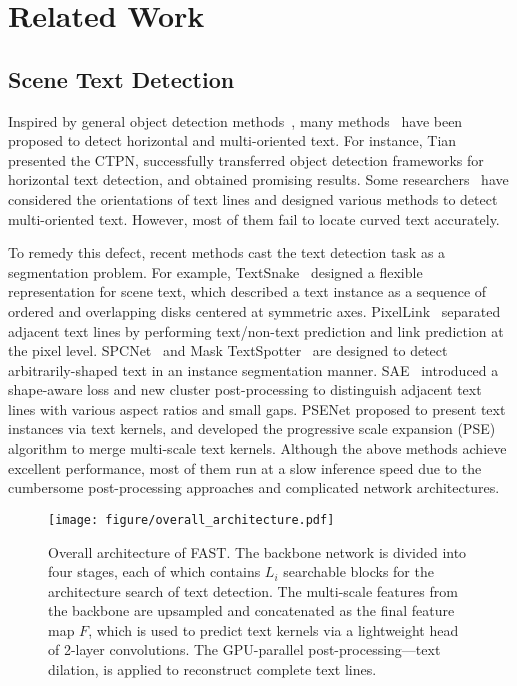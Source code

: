 \documentclass[lettersize,journal]{IEEEtran}
\begin{document}
\section{Related Work}

\subsection{Scene Text Detection}
Inspired by general object detection methods~\cite{liu2016ssd,ren2016faster,he2017mask}, many methods~\cite{liao2018textboxes++,liao2017textboxes,liao2018rotation,ma2018arbitrary,shi2017detecting,zhou2017east,tian2016detecting} have been proposed to detect horizontal and multi-oriented text. 
For instance, Tian \etal~\cite{tian2016detecting} presented the CTPN, successfully transferred object detection frameworks for horizontal text detection, and obtained promising results. 
Some researchers~\cite{zhou2017east,liao2018textboxes++,liao2018rotation} have considered the orientations of text lines and designed various methods to detect multi-oriented text. 
However, most of them fail to locate curved text accurately.

To remedy this defect, recent methods cast the text detection task as a segmentation problem.
For example, TextSnake~\cite{long2018textsnake} designed a flexible representation for scene text, which described a text instance as a sequence of ordered and overlapping disks centered at symmetric axes.
PixelLink~\cite{deng2018pixellink} separated adjacent text lines by performing text/non-text prediction and link prediction at the pixel level.
SPCNet~\cite{xie2019scene} and Mask TextSpotter~\cite{lyu2018mask} are designed to detect arbitrarily-shaped text in an instance segmentation manner.
SAE~\cite{tian2019learning} introduced a shape-aware loss and new cluster post-processing to distinguish adjacent text lines with various aspect ratios and small gaps.
PSENet \cite{wang2019shape} proposed to present text instances via text kernels, and developed the progressive scale expansion (PSE) algorithm to merge multi-scale text kernels.
Although the above methods achieve excellent performance, most of them run at a slow inference speed due to the cumbersome post-processing approaches and complicated network architectures.


\begin{figure*}[tbp]
    \centering
    \texttt{[image: figure/overall\_architecture.pdf]}
    \caption{
        Overall architecture of FAST.
        The backbone network is divided into four stages, each of which contains $L_i$ searchable blocks for the architecture search of text detection.
        The multi-scale features from the backbone are upsampled and concatenated as the final feature map $F$, which is used to predict text kernels via a lightweight head~\cite{wang2019efficient} of 2-layer convolutions.
        The GPU-parallel post-processing---text dilation, is applied to reconstruct complete text lines.
        }
    \label{fig:overall_architecture}
\end{figure*}
\end{document}
